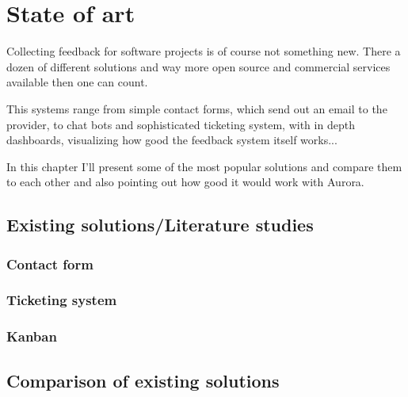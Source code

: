 \chapter{State of art}

Collecting feedback for software projects is of course not something new. There a dozen of different solutions and way more open source and commercial services available then one can count.

This systems range from simple contact forms, which send out an email to the provider, to chat bots and sophisticated ticketing system, with in depth dashboards, visualizing how good the feedback system itself works...

In this chapter I'll present some of the most popular solutions and compare them to each other and also pointing out how good it would work with Aurora.

\section{Existing solutions/Literature studies}


\subsection{Contact form}

\subsection{Ticketing system}

\subsection{Kanban}

\section{Comparison of existing solutions}

